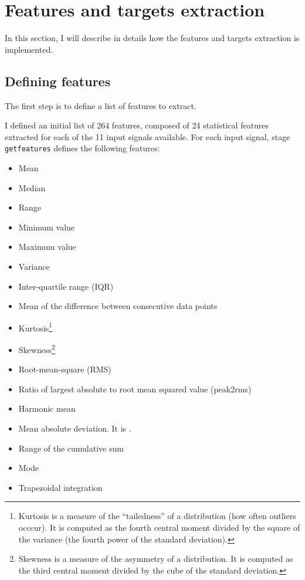 \section{Features and targets extraction}\label{sec:extractfeaturestargets}

In this section, I will describe in details how the features and targets
extraction is implemented.

\subsection{Defining features}\label{subsec:getfeaturesstage}

The first step is to define a list of features to extract.

I defined an initial list of 264 features, composed of 24 statistical features
extracted for each of the 11 input signals available. For each input signal,
stage \texttt{getfeatures} defines the following features:

\noindent\underline{}
\begin{multicols}{2}
\begin{itemize}
\item Mean
\item Median
\item Range
\item Minimum value
\item Maximum value
\item Variance
\item Inter-quartile range (IQR)
\item Mean of the difference between consecutive data points
\item Kurtosis\footnote{Kurtosis is a measure of the ``tailedness'' of a
	distribution (how often outliers occcur). It is computed as the fourth
	central moment divided by the square of the variance (the fourth power
	of the standard deviation).}
\item Skewness\footnote{Skewness is a measure of the asymmetry of a
	distribution. It is computed as the third central moment divided by the
	cube of the standard deviation.}
\item Root-mean-square (RMS)
\item Ratio of largest absolute to root mean squared value (peak2rms)
\item Harmonic mean
\item Mean absolute deviation. It is .
\item Range of the cumulative sum
\item Mode
\item Trapezoidal integration
\end{itemize}
\end{multicols}

